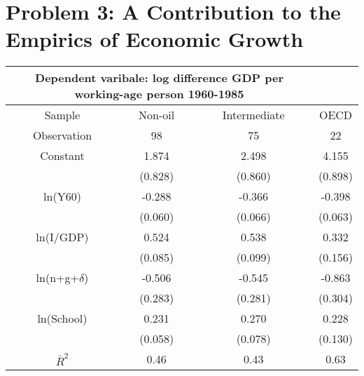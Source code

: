 \pagebreak
\section*{Problem 3: A Contribution to the Empirics of Economic Growth}

\begin{table}[htpb]
\centering
\begin{tabular}{cccc}
\hline
\hline
\multicolumn{3}{c}{Dependent varibale: log difference GDP per working-age person 1960-1985}\\
\hline

	Sample & 	Non-oil & 	Intermediate & 	OECD\\
	Observation & 	98 & 	75 & 	22\\
	Constant & 	1.874 & 	2.498 & 	4.155\\
	 & 	(0.828) & 	(0.860) & 	(0.898)\\
	ln(Y60) & 	-0.288 & 	-0.366 & 	-0.398\\
	 & 	(0.060) & 	(0.066) & 	(0.063)\\
	ln(I/GDP) & 	0.524 & 	0.538 & 	0.332\\
	 & 	(0.085) & 	(0.099) & 	(0.156)\\
	ln(n+g+$\delta$) & 	-0.506 & 	-0.545 & 	-0.863\\
	 & 	(0.283) & 	(0.281) & 	(0.304)\\
	ln(School) & 	0.231 & 	0.270 & 	0.228\\
	 & 	(0.058) & 	(0.078) & 	(0.130)\\
	$\bar{R}^2$ & 	0.46 & 	0.43 & 	0.63\\
\hline
\hline
\end{tabular}
\end{table}